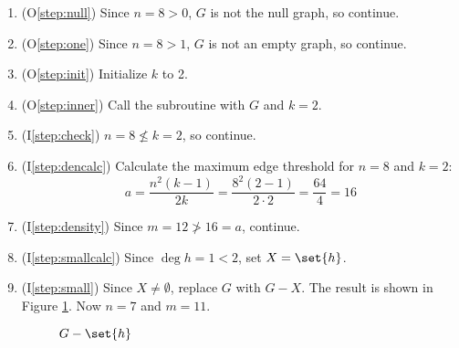 \begin{enumerate}
\item (O\ref{step:null}) Since \(n=8>0\), \(G\) is not the null graph, so continue.

\item (O\ref{step:one}) Since \(n=8>1\), \(G\) is not an empty graph, so continue.

\item (O\ref{step:init}) Initialize \(k\) to 2.

\item (O\ref{step:inner}) Call the subroutine with \(G\) and \(k=2\).

\item (I\ref{step:check}) \(n=8\nleq k=2\), so continue.

\item (I\ref{step:dencalc}) Calculate the maximum edge threshold for \(n=8\) and \(k=2\):
  \[a=\frac{n^2(k-1)}{2k}=\frac{8^2(2-1)}{2\cdot2}=\frac{64}{4}=16\]

\item (I\ref{step:density}) Since \(m=12\ngtr16=a\), continue.

\item (I\ref{step:smallcalc}) Since \(\deg{h}=1<2\), set \(X=\set{h}\).

\item (I\ref{step:small}) Since \(X\ne\emptyset\), replace \(G\) with \(G-X\).  The result is shown in Figure
  \ref{fig:removeh}.  Now \(n=7\) and \(m=11\).

  \begin{figure}[h]
    \label{fig:removeh}
    \begin{center}
    \end{center}
    \caption{\(G-\set{h}\)}
  \end{figure}


\end{enumerate}
